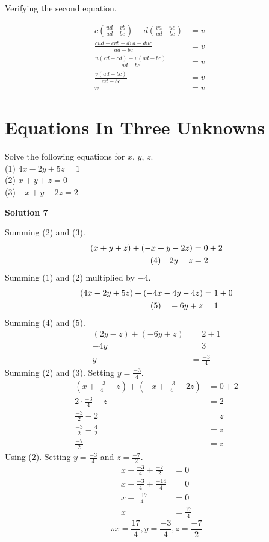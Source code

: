 \documentclass[6pt]{article}
\begin{document}
Verifying the second equation.

\begin{align*}
    c\left(\frac{ud - vb}{ad - bc}\right) + d\left(\frac{va - uc}{ad - bc}\right) &= v && \\
    \frac{cud - cvb + dva - duc}{ad - bc} &= v && \\
    \frac{u(cd - cd) + v(ad - bc)}{ad - bc} &= v && \\
    \frac{v(ad - bc)}{ad - bc} &= v && \\
    v &= v
\end{align*}

\section{Equations In Three Unknowns}

\begin{tcolorbox}[title=Problem 7, breakable]
    Solve the following equations for $x$, $y$, $z$. \\
    ($1$) $4x - 2y + 5z = 1$ \\
    ($2$) $x + y + z = 0$ \\
    ($3$) $-x + y -2z = 2$
\end{tcolorbox}

\textbf{Solution 7}

Summing ($2$) and ($3$).
\begin{align*}
    (x + y + z) + (-x + y -2z) &= 0 + 2 \\
    \hspace{-2cm}\text{(4)}\quad 2y - z &= 2
\end{align*}
Summing ($1$) and ($2$) multiplied by $-4$.
\begin{align*}
    (4x - 2y + 5z) + (-4x - 4y - 4z) &= 1 + 0 \\
    \hspace{-2cm}\text{(5)}\quad -6y + z &= 1
\end{align*}
Summing ($4$) and ($5$).
\begin{align*}
    (2y - z) + (-6y + z) &= 2 + 1 \\
    -4y &= 3 \\
    y &= \frac{-3}{4}
\end{align*}
Summing ($2$) and ($3$). Setting $y = \frac{-3}{4}$.
\begin{align*}
    (x + \frac{-3}{4} + z) + (-x + \frac{-3}{4} -2z) &= 0 + 2 \\
    2 \cdot \frac{-3}{4} - z &= 2 \\
    \frac{-3}{2} - 2 &= z \\
    \frac{-3}{2} - \frac{4}{2} &= z \\
    \frac{-7}{2} &= z 
\end{align*}
Using ($2$). Setting $y = \frac{-3}{4}$ and $z = \frac{-7}{2}$.
\begin{align*}
    x + \frac{-3}{4} + \frac{-7}{2} &= 0 \\
    x + \frac{-3}{4} + \frac{-14}{4} &= 0 \\
    x + \frac{-17}{4} &= 0 \\
    x &=  \frac{17}{4}
\end{align*}
\[\therefore x =  \frac{17}{4}, y = \frac{-3}{4}, z = \frac{-7}{2} \]
\end{document}
